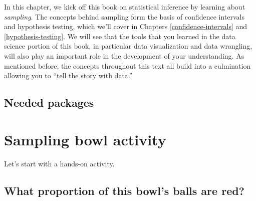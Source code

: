 \documentclass[
]{book}
\newenvironment{Shaded}{\begin{snugshade}}{\end{snugshade}}
\newcommand{\CommentTok}[1]{\textcolor[rgb]{0.56,0.35,0.01}{\textit{#1}}}
\newcommand{\ControlFlowTok}[1]{\textcolor[rgb]{0.13,0.29,0.53}{\textbf{#1}}}
\newcommand{\KeywordTok}[1]{\textcolor[rgb]{0.13,0.29,0.53}{\textbf{#1}}}
\newcommand{\NormalTok}[1]{#1}
\newcommand{\OperatorTok}[1]{\textcolor[rgb]{0.81,0.36,0.00}{\textbf{#1}}}
\newcommand{\StringTok}[1]{\textcolor[rgb]{0.31,0.60,0.02}{#1}}
\begin{document}
In this chapter, we kick off this book on statistical inference by learning about \emph{sampling}. The concepts behind sampling form the basis of confidence intervals and hypothesis testing, which we'll cover in Chapters \ref{confidence-intervals} and \ref{hypothesis-testing}. We will see that the tools that you learned in the data science portion of this book, in particular data visualization and data wrangling, will also play an important role in the development of your understanding. As mentioned before, the concepts throughout this text all build into a culmination allowing you to ``tell the story with data.''

\hypertarget{needed-packages}{%
\subsection*{Needed packages}\label{needed-packages}}

\begin{Shaded}
\end{Shaded}

\hypertarget{sampling-activity}{%
\section{Sampling bowl activity}\label{sampling-activity}}

Let's start with a hands-on activity.

\hypertarget{what-proportion-of-this-bowls-balls-are-red}{%
\subsection{What proportion of this bowl's balls are red?}\label{what-proportion-of-this-bowls-balls-are-red}}
\end{document}
